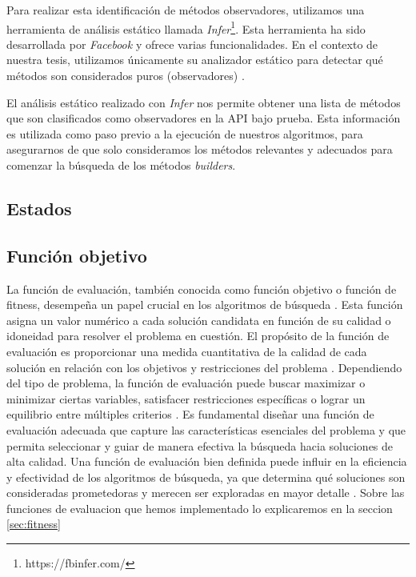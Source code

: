 Para realizar esta identificación de métodos observadores, utilizamos una
herramienta de análisis estático llamada
\emph{Infer}\footnote{https://fbinfer.com/}. Esta herramienta ha sido
desarrollada por \emph{Facebook} y ofrece varias funcionalidades. En el contexto
de nuestra tesis, utilizamos únicamente su analizador estático para detectar qué
métodos son considerados puros (observadores) .

El análisis estático realizado con \emph{Infer} nos permite obtener una lista de
métodos que son clasificados como observadores en la API bajo prueba. Esta
información es utilizada como paso previo a la ejecución de nuestros algoritmos,
para asegurarnos de que solo consideramos los métodos relevantes y adecuados
para comenzar la búsqueda de los métodos \emph{builders}. 

\subsection{Estados}


\subsection{Función objetivo}





La función de evaluación, también conocida como función objetivo o función de
fitness, desempeña un papel crucial en los algoritmos de búsqueda
. Esta función asigna un valor numérico a cada solución candidata
en función de su calidad o idoneidad  para resolver el
problema en cuestión. El propósito de la función de evaluación es proporcionar
una medida cuantitativa de la calidad de cada solución en relación con los
objetivos y restricciones del problema . Dependiendo del tipo de problema, la función de
evaluación puede buscar maximizar o minimizar ciertas variables, satisfacer
restricciones específicas o lograr un equilibrio entre múltiples criterios
. Es fundamental diseñar una función de evaluación adecuada que capture las
características esenciales del problema y que permita seleccionar y guiar de
manera efectiva la búsqueda hacia soluciones de alta calidad. Una función de evaluación bien
definida puede influir en la eficiencia y efectividad de los algoritmos de
búsqueda, ya que determina qué soluciones son consideradas prometedoras y
merecen ser exploradas en mayor detalle . Sobre las funciones de evaluacion que hemos implementado lo explicaremos en la seccion \ref{sec:fitness}




